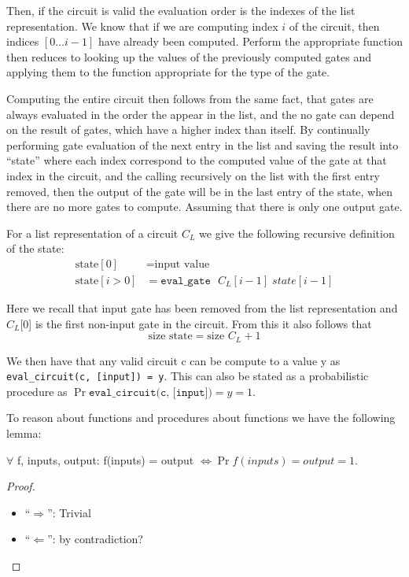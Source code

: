 Then, if the circuit is valid the evaluation order is the indexes of the list representation.
We know that if we are computing index $i$ of the circuit, then indices
$[0 \dots i-1]$ have already been computed. Perform the appropriate function
then reduces to looking up the values of the previously computed gates and
applying them to the function appropriate for the type of the gate.

Computing the entire circuit then follows from the same fact, that gates are always
evaluated in the order the appear in the list, and the no gate can depend on
the result of gates, which have a higher index than itself. By continually
performing gate evaluation of the next entry in the list and saving the result
into ``state'' where each index correspond to the computed value of the gate at
that index in the circuit, and the calling recursively on the list with the
first entry removed, then the output of the gate will be in the last entry of
the state, when there are no more gates to compute. Assuming that there is only
one output gate.

\begin{definition}
  For a list representation of a circuit $C_{L}$ we give the following recursive
  definition of the state:
  \begin{align*}
    \text{state}[0] &= \text{input value} \\
    \text{state}[i>0] &= \texttt{eval\_{gate} } C_{L}[i-1] \; state[i-1]
  \end{align*}

  Here we recall that input gate has been removed from the list representation
  and $C_{L}$[0] is the first non-input gate in the circuit. From this it also
  follows that
  \begin{equation}
    \text{size } \text{state} = \text{size } C_{L} + 1
  \end{equation}
\end{definition}

We then have that any valid circuit c can be compute to a value y as
\texttt{eval\_circuit(c, [input]) = y}. This can also be stated as a probabilistic
procedure as $\Pr{\texttt{eval\_circuit(c, [input])} = y} = 1$.

To reason about functions and procedures about functions we have the following lemma:
\begin{lemma}
  \label{lem:func/proc-equiv}
  $\forall$ f, inputs, output: f(inputs) = output $\iff \Pr{f(inputs) = output} = 1$.
\end{lemma}
\begin{proof}
  \hspace{2mm}
  \begin{itemize}
    \item  ``$\Rightarrow$'':
      Trivial
    \item  ``$\Leftarrow$'':
      by contradiction?
  \end{itemize}
\end{proof}

